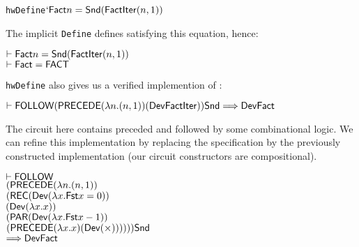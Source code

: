 \vspace*{-2mm}

{\baselineskip10pt\begin{alltt}
 hwDefine\( `\DEF{Fact} n = \DEF{Snd}(\DEF{FactIter} (n,1))  \)
\end{alltt}}

\vspace*{-2mm}

\noindent The implicit \texttt{Define} defines  satisfying this equation, hence:

\vspace*{-2mm}

{\baselineskip14pt\begin{alltt}
\( \vdash \DEF{Fact} n = \DEF{Snd}(\DEF{FactIter}(n,1)) \)
\( \vdash \DEF{Fact} = \DEF{FACT}                       \)
\end{alltt}}

\vspace*{-2mm}

\noindent \texttt{hwDefine} also gives us a verified implemention of
:

\vspace*{-2mm}

{\baselineskip10pt\begin{alltt}
\( \vdash \DEF{FOLLOW} (\DEF{PRECEDE} ({\lambda}n. (n,1)) (\DEF{Dev} \DEF{FactIter})) \DEF{Snd} \Longrightarrow \DEF{Dev} \DEF{Fact} \)
\end{alltt}}

\vspace*{-2mm}

\noindent The circuit here contains  preceded and
followed by some combinational logic. We can refine this
implementation by replacing the specification
 by the previously constructed implementation
(our circuit constructors are compositional).

\vspace*{-2mm}

{\baselineskip10pt\begin{alltt}
\( \vdash \DEF{FOLLOW}                                                                   \)
\(     (\DEF{PRECEDE} ({\lambda}n. (n,1))                                                \)
\(        (\DEF{REC} (\DEF{Dev} ({\lambda}x. \DEF{Fst} x = 0))                           \)
\(             (\DEF{Dev} ({\lambda}x. x))                                               \)
\(             (\DEF{PAR} (\DEF{Dev} ({\lambda}x. \DEF{Fst} x - 1))                      \)
\(                  (\DEF{PRECEDE} ({\lambda}x. x) (\DEF{Dev}({\times})))))) \DEF{Snd}   \)
\(    \Longrightarrow \DEF{Dev} \DEF{Fact}                                               \)
\end{alltt}}

